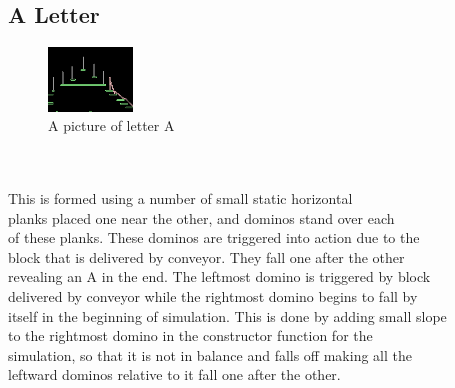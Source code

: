 \subsection{A Letter}
\begin{figure}
	\caption{A picture of letter A}
	\centering
	 \includegraphics[width=0.2\textwidth]{./doc/A.png}%
\end{figure}
\begin{frame}
\centering
\\
\\
This is formed using a number of small static horizontal \\planks placed one near the other, and dominos stand over each\\ of these planks.
These dominos are triggered into action due to the\\ block that is delivered by conveyor. They fall one after the other \\revealing an A in the end. The leftmost domino is triggered by block \\delivered by conveyor while the rightmost domino begins to fall by \\itself in the beginning of simulation. This is done by adding small slope \\to the rightmost domino in the constructor function for the \\simulation, so that it is not in balance and falls off making all the \\leftward dominos relative to it fall one after the other.
\end{frame}
\\
\\


